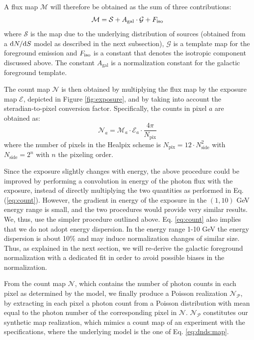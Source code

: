 \noindent
%
A flux map $\mathcal{M}$ will therefore be obtained as the sum of three contributions:
\begin{equation}
    \mathcal{M} = \mathcal{S} + A_\textrm{gal} \cdot \mathcal{G} + F_{\text{iso}}
    \label{eq:dnds:map}
\end{equation}
where $\mathcal{S}$ is the map due to the underlying distribution of sources (obtained from a $\text{d}N/\text{d}S$ model as described in the next subsection), $\mathcal{G}$ is a template map for the foreground emission and $F_{\text{iso}}$ is a constant that denotes the isotropic component discussed above. The constant $A_\textrm{gal}$ is a normalization constant for the galactic foreground template. 

The count map $\mathcal{N}$ is then obtained by multiplying the flux map by the \fermi exposure map $\mathcal{E}$, depicted in Figure \ref{fig:exposure}, and by taking into account the steradian-to-pixel conversion factor. Specifically, the counts in pixel $a$ are obtained as:
\begin{equation}
    \mathcal{N}_a = \mathcal{M}_a \cdot \mathcal{E}_a \cdot \frac{4\pi}{N_\textrm{pix}}
    \label{eq:count}
\end{equation}
%
where the number of pixels in the Healpix scheme is $N_\textrm{pix} = 12\cdot N^2_\textrm{side}$ with $N_\textrm{side} = 2^{n}$ with $n$ the pixeling order.

Since the exposure slightly changes with energy, the above procedure could be improved by performing a convolution in energy of the photon flux with the exposure, instead of directly multiplying the two quantities as performed in Eq. (\ref{eq:count}). However, the gradient in energy of the exposure in the $(1,10)$ GeV energy range is small, and the two procedures would provide very similar results.  We, thus, use the simpler procedure outlined above. 
Eq. \ref{eq:count} also implies that we do not adopt energy dispersion. In the energy range 1-10 GeV the energy dispersion is about 10\% \cite{Fermi-LAT:2013jgq} and may induce normalization changes of similar size.
Thus, as explained in the next section, we will re-derive the galactic foreground normalization with a dedicated fit in order to avoid possible biases in the normalization.

From the count map $\mathcal{N}$, which contains the number of photon counts in each pixel as determined by the model, we finally produce a Poisson realization $\mathcal{N}_\mathcal{P}$, by extracting in each pixel a photon count from a Poisson distribution with mean equal to the photon number of the corresponding pixel in $\mathcal{N}$. $\mathcal{N}_\mathcal{P}$ constitutes our synthetic map realization, which mimics a count map of an experiment with the \fermi specifications, where the underlying model is the one of Eq. \ref{eq:dnds:map}.

